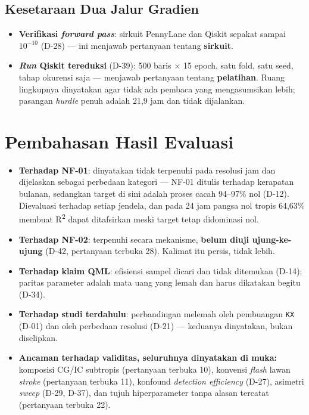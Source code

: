 \subsection{Kesetaraan Dua Jalur Gradien}

\begin{itemize}
    \item \textbf{Verifikasi \textit{forward pass}}: sirkuit PennyLane dan
          Qiskit sepakat sampai $10^{-10}$ (D-28) --- ini menjawab pertanyaan
          tentang \textbf{sirkuit}.
    \item \textbf{\textit{Run} Qiskit tereduksi} (D-39): 500 baris $\times$ 15
          epoch, satu fold, satu seed, tahap okurensi saja --- menjawab
          pertanyaan tentang \textbf{pelatihan}. Ruang lingkupnya dinyatakan
          agar tidak ada pembaca yang mengasumsikan lebih; pasangan
          \textit{hurdle} penuh adalah 21,9 jam dan tidak dijalankan.
\end{itemize}

\section{Pembahasan Hasil Evaluasi}

\begin{itemize}
    \item \textbf{Terhadap NF-01}: dinyatakan tidak terpenuhi pada resolusi jam
          dan dijelaskan sebagai perbedaan kategori --- NF-01 ditulis terhadap
          kerapatan bulanan, sedangkan target di sini adalah proses cacah
          94--97\% nol (D-12). Dievaluasi terhadap setiap jendela, dan pada 24
          jam pangsa nol tropis 64,63\% membuat R\textsuperscript{2} dapat
          ditafsirkan meski target tetap didominasi nol.
    \item \textbf{Terhadap NF-02}: terpenuhi secara mekanisme, \textbf{belum
          diuji ujung-ke-ujung} (D-42, pertanyaan terbuka 28). Kalimat itu
          persis, tidak lebih.
    \item \textbf{Terhadap klaim QML}: efisiensi sampel dicari dan tidak
          ditemukan (D-14); paritas parameter adalah mata uang yang lemah dan
          harus dikatakan begitu (D-34).
    \item \textbf{Terhadap studi terdahulu}: perbandingan melemah oleh
          pembuangan \texttt{KX} (D-01) dan oleh perbedaan resolusi
          (D-21) --- keduanya dinyatakan, bukan diselipkan.
    \item \textbf{Ancaman terhadap validitas, seluruhnya dinyatakan di muka:}
          komposisi CG/IC subtropis (pertanyaan terbuka 10), konvensi
          \textit{flash} lawan \textit{stroke} (pertanyaan terbuka 11), konfound
          \textit{detection efficiency} (D-27), asimetri \textit{sweep}
          (D-29, D-37), dan tujuh hiperparameter tanpa alasan tercatat
          (pertanyaan terbuka 22).
\end{itemize}
